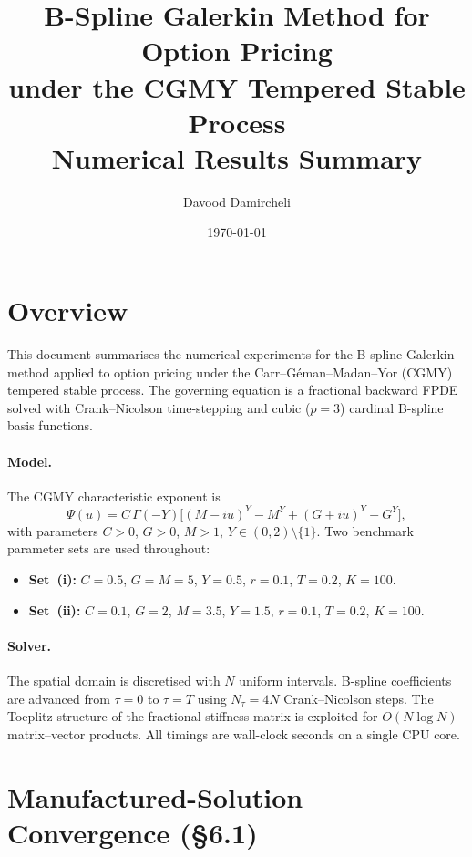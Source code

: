 \documentclass[11pt,a4paper]{article}
\title{\textbf{B-Spline Galerkin Method for Option Pricing\\
under the CGMY Tempered Stable Process}\\[0.4em]
\large Numerical Results Summary}
\author{Davood Damircheli}
\date{\today}
\begin{document}
\maketitle
\tableofcontents
\bigskip

\section{Overview}

This document summarises the numerical experiments for the B-spline Galerkin
method applied to option pricing under the
Carr--G\'{e}man--Madan--Yor (CGMY) tempered stable process.
The governing equation is a fractional backward FPDE solved with
Crank--Nicolson time-stepping and cubic ($p=3$) cardinal B-spline basis
functions.

\paragraph{Model.}
The CGMY characteristic exponent is
\[
  \Psi(u) = C\,\Gamma(-Y)\bigl[(M-iu)^Y - M^Y + (G+iu)^Y - G^Y\bigr],
\]
with parameters $C>0$, $G>0$, $M>1$, $Y\in(0,2)\setminus\{1\}$.
Two benchmark parameter sets are used throughout:
\begin{itemize}
  \item \textbf{Set~(i):} $C=0.5$, $G=M=5$, $Y=0.5$, $r=0.1$,
        $T=0.2$, $K=100$.
  \item \textbf{Set~(ii):} $C=0.1$, $G=2$, $M=3.5$, $Y=1.5$, $r=0.1$,
        $T=0.2$, $K=100$.
\end{itemize}

\paragraph{Solver.}
The spatial domain is discretised with $N$ uniform intervals.
B-spline coefficients are advanced from $\tau=0$ to $\tau=T$ using
$N_\tau = 4N$ Crank--Nicolson steps.
The Toeplitz structure of the fractional stiffness matrix is exploited for
$O(N\log N)$ matrix--vector products.
All timings are wall-clock seconds on a single CPU core.

\section{Manufactured-Solution Convergence (\S6.1)}
\end{document}
